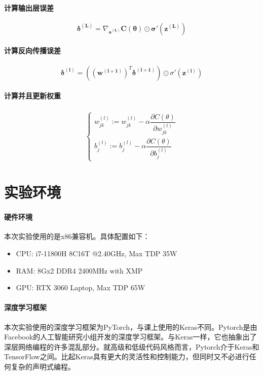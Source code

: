 \documentclass[cn,black,10pt,normal]{elegantnote}
\newcommand{\upcite}[1]{\textsuperscript{\textsuperscript{\cite{#1}}}}
\begin{document}
\paragraph{计算输出层误差}
\begin{equation}
    \boldsymbol{\delta^{(L)}}=\nabla_{\boldsymbol{a^{(L)}}}\boldsymbol{C(\theta)}\odot\boldsymbol{\sigma'(z^{(L)})}
\end{equation}

\paragraph{计算反向传播误差}
\begin{equation}
    \boldsymbol{\delta^{(l)}}=\left((\boldsymbol{w^{(l+1)}})^T\boldsymbol{\delta^{(l+1)}}\right)\odot\sigma'(\boldsymbol{z^{(l)}})
\end{equation}

\paragraph{计算并且更新权重}
\begin{equation}
    \begin{aligned} \begin{cases} w_{jk}^{(l)}:=w_{jk}^{(l)}-\alpha\dfrac{\partial C(\theta)}{\partial w_{jk}^{(l)}}\\ b_j^{(l)}:=b_j^{(l)}-\alpha\dfrac{\partial C(\theta)}{\partial b_j^{(l)}} \end{cases} \end{aligned}
\end{equation}

\section{实验环境}

\paragraph{硬件环境} 本次实验使用的是x86兼容机。具体配置如下：
\begin{itemize}
    \item CPU: i7-11800H 8C16T @2.40GHz, Max TDP 35W
    \item RAM: 8Gx2 DDR4 2400MHz with XMP
    \item GPU: RTX 3060 Laptop, Max TDP 65W
\end{itemize}

\paragraph{深度学习框架} 本次实验使用的深度学习框架为PyTorch，与课上使用的Keras不同。Pytorch是由Facebook的人工智能研究小组开发的深度学习框架。与Keras一样，它也抽象出了深层网络编程的许多混乱部分。就高级和低级代码风格而言，Pytorch介于Keras和TensorFlow之间。比起Keras具有更大的灵活性和控制能力，但同时又不必进行任何复杂的声明式编程。\upcite{pytrc}
\end{document}
